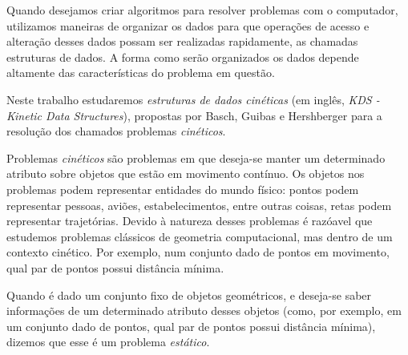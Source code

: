 

\label{cap:introducao}

\enlargethispage{.5\baselineskip}

Quando desejamos criar algoritmos para resolver problemas com o computador,
utilizamos maneiras de organizar os dados para que operações de acesso e
alteração desses dados possam ser realizadas rapidamente, as chamadas estruturas
de dados. A forma como serão organizados os dados depende altamente das
características do problema em questão.

Neste trabalho estudaremos \textit{estruturas de dados cinéticas} (em inglês,
\emph{KDS - Kinetic Data Structures}), propostas por Basch, Guibas e Hershberger
para a resolução dos chamados problemas \textit{cinéticos}.

Problemas \textit{cinéticos} são problemas em que deseja-se manter um
determinado atributo sobre objetos que estão em movimento contínuo. Os objetos
nos problemas podem representar entidades do mundo físico: pontos podem
representar pessoas, aviões, estabelecimentos, entre outras coisas, retas podem
representar trajetórias. Devido à natureza desses problemas é razóavel que
estudemos problemas clássicos de geometria computacional, mas dentro de um
contexto cinético. Por exemplo, num conjunto dado de pontos em movimento, qual
par de pontos possui distância mínima.

Quando é dado um conjunto fixo de objetos geométricos, e deseja-se saber
informações de um determinado atributo desses objetos (como, por exemplo, em um
conjunto dado de pontos, qual par de pontos possui distância mínima), dizemos
que esse é um problema \textit{estático}.

